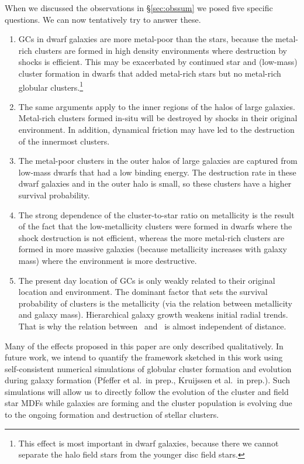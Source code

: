 \documentclass{aa}
\begin{document}
When we discussed the observations in \S\ref{sec:obssum} we posed five specific questions. We can now tentatively 
try to answer these.
\begin{enumerate}
\item[Q1.] GCs in dwarf galaxies are more metal-poor than the stars, because the metal-rich clusters are formed in high density 
environments where destruction by shocks is efficient. 
This may be exacerbated by continued star and (low-mass) cluster formation in dwarfs that added metal-rich stars but no metal-rich globular clusters.\footnote{This effect is most important in dwarf galaxies, because there we cannot separate the halo field stars from the younger disc field stars.}
\item[Q2.] The same arguments apply to the inner regions of the halos of large galaxies. Metal-rich clusters formed in-situ
will be destroyed by shocks in their original environment. In addition, dynamical friction may have led to the destruction of the innermost clusters.
\item[Q3.] The metal-poor clusters in the outer halos of large galaxies are captured from low-mass dwarfs that had a low binding energy. The destruction rate in these dwarf galaxies and in the outer halo is small, so these clusters have a higher survival probability.
\item[Q4.] The strong dependence of the cluster-to-star ratio on metallicity is the result of the fact that the low-metallicity clusters were formed in dwarfs where the shock destruction is not efficient, whereas the more metal-rich clusters are formed in more massive galaxies (because metallicity increases with galaxy mass) where the environment is more destructive.
\item[Q5.] The present day location of GCs is only weakly related to their original location and environment. The dominant factor that sets the survival probability of clusters is the metallicity (via the relation between metallicity and galaxy mass). Hierarchical galaxy growth weakens initial radial trends. That is why 
the relation between \Rgcst\ and \feh\ is almost independent of distance.
\end{enumerate}

Many of the effects proposed in this paper are only described qualitatively. In future work, we intend to quantify the framework sketched in this work using self-consistent numerical simulations of globular cluster formation and evolution during galaxy formation (Pfeffer et al.~in prep., Kruijssen et al.~in prep.). Such simulations will allow us to directly follow the evolution of the cluster and field star MDFs while galaxies are forming and the cluster population is evolving due to the ongoing formation and destruction of stellar clusters.
\end{document}
